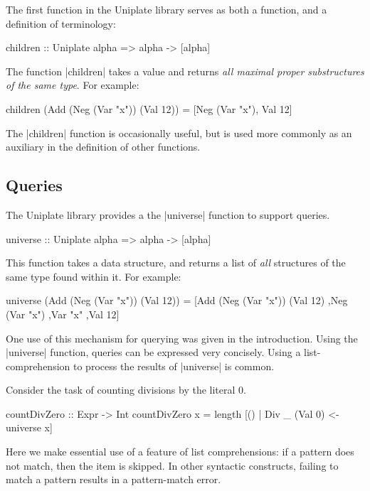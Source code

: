 The first function in the Uniplate library serves as both a function, and a definition of terminology:

\begin{code}
children :: Uniplate alpha => alpha -> [alpha]
\end{code}

The function |children| takes a value and returns \textit{all maximal proper substructures of the same type}. For example:

\begin{code}
children (Add (Neg (Var "x")) (Val 12)) = [Neg (Var "x"), Val 12]
\end{code}

The |children| function is occasionally useful, but is used more commonly as an auxiliary in the definition of other functions.


\subsection{Queries}

The Uniplate library provides a the |universe| function to support queries.

\begin{code}
universe :: Uniplate alpha => alpha -> [alpha]
\end{code}

This function takes a data structure, and returns a list of \textit{all} structures of the same type found within it. For example:

\begin{code}
universe (Add (Neg (Var "x")) (Val 12)) =
    [Add (Neg (Var "x")) (Val 12)
    ,Neg (Var "x")
    ,Var "x"
    ,Val 12]
\end{code}

One use of this mechanism for querying was given in the introduction. Using the |universe| function, queries can be expressed very concisely. Using a list-comprehension to process the results of |universe| is common.

\begin{example}
\label{exU:zerocount}
Consider the task of counting divisions by the literal 0.

\begin{code}
countDivZero :: Expr -> Int
countDivZero x = length [() | Div _ (Val 0) <- universe x]
\end{code}

Here we make essential use of a feature of list comprehensions: if a pattern does not match, then the item is skipped. In other syntactic constructs, failing to match a pattern results in a pattern-match error.
\end{example}

